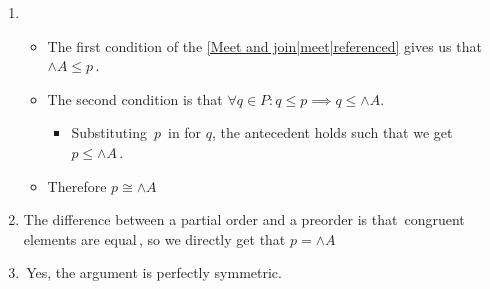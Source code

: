 \begin{enumerate}
    \item \begin{itemize}
            \item The first condition of the \ref{Meet and join|meet|referenced} gives us that \,$\wedge A \leq p$\,.
            \item The second condition is that $\forall q \in P: q \leq p \implies q \leq \wedge A$.
                  \begin{itemize}
                    \item Substituting \,$p$\, in for $q$, the antecedent holds such that we get \,$p \leq \wedge A$\,.
                  \end{itemize}
            \item Therefore $p \cong \wedge A$
          \end{itemize}
    \item The difference between a partial order and a preorder is that \,congruent elements are equal\,, so we directly get that $p = \wedge A$
    \item \,Yes, the argument is perfectly symmetric.\,
  \end{enumerate}
